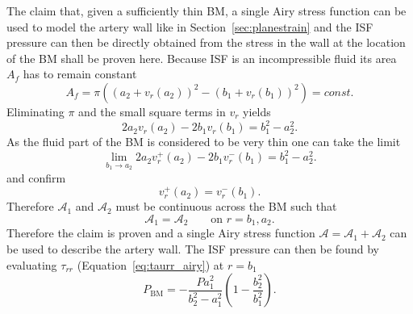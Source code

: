 \documentclass{frontiers_suppmat} %
\newcommand{\beq}{\begin{equation}}
\newcommand{\eeq}{\end{equation}}
\newcommand{\ra}{\rightarrow}
\newcommand{\taurr}{\tau_{rr}}
\newcommand{\Airy}{\mathcal{A}}
\begin{document}
The claim that, given a sufficiently thin BM, a single Airy stress function can be used to model the artery wall like in Section~\ref{sec:planestrain} and the ISF pressure can then be directly obtained from the stress in the wall at the location of the BM shall be proven here. Because ISF is an incompressible fluid its area $A_f$ has to remain constant
\beq
A_f = \pi \left( \left( a_2 + v_r(a_2) \right)^2 - \left( b_1 + v_r(b_1) \right)^2 \right) = const.
\eeq
Eliminating $\pi$ and the small square terms in $v_r$ yields
\beq
2a_2 v_r(a_2) - 2b_1 v_r(b_1) = b_1^2 - a_2^2.
\eeq
As the fluid part of the BM is considered to be very thin one can take the limit
\beq
\lim_{b_1 \ra a_2} 2a_2 v_r^+(a_2) - 2b_1 v_r^-(b_1) = b_1^2 - a_2^2.
\eeq
and confirm
\beq
v_r^+(a_2) = v_r^-(b_1).
\eeq
Therefore $\Airy_1$ and $\Airy_2$ must be continuous across the BM such that
\beq
\Airy_1 = \Airy_2 \qquad \text{on } r = b_1, a_2.
\eeq
Therefore the claim is proven and a single Airy stress function $\Airy = \Airy_1 + \Airy_2$ can be used to describe the artery wall. The ISF pressure can then be found by evaluating $\taurr$ (Equation~\ref{eq:taurr_airy}) at $r = b_1$
\beq\label{eq:bm_pressure}
P_{\text{BM}} = - \frac{P a_1^2}{b_2^2 - a_1^2} \left( 1 - \frac{b_2^2}{b_1^2} \right).
\eeq
\end{document}
